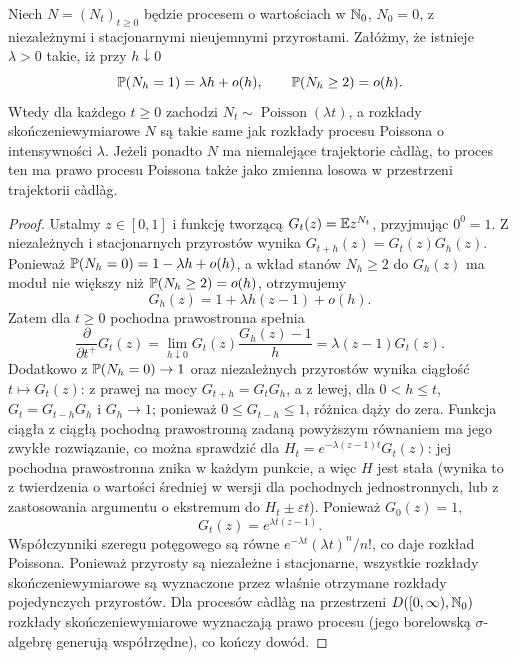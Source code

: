 \begin{twierdzenie}
\label{thm:poisson-infinitesimal}
Niech $N=(N_t)_{t\ge0}$ będzie procesem o wartościach
w $\mathbb{N}_0$, $N_0=0$, z niezależnymi i stacjonarnymi
nieujemnymi przyrostami. Załóżmy, że istnieje $\lambda>0$
takie, iż przy $h\downarrow0$
\[
\mathbb{P}(N_h=1)=\lambda h+o(h),\qquad
\mathbb{P}(N_h\ge2)=o(h).
\]
Wtedy dla każdego $t\ge0$ zachodzi
$N_t\sim\operatorname{Poisson}(\lambda t)$,
a rozkłady skończeniewymiarowe $N$ są takie same jak
rozkłady procesu Poissona o intensywności $\lambda$.
Jeżeli ponadto $N$ ma niemalejące trajektorie c\`adl\`ag,
to proces ten ma prawo procesu Poissona także jako
zmienna losowa w przestrzeni trajektorii c\`adl\`ag.
\end{twierdzenie}
\begin{proof}
Ustalmy $z\in[0,1]$ i funkcję tworzącą
$G_t(z)=\mathbb{E} z^{N_t}$, przyjmując $0^0=1$.
Z niezależnych i stacjonarnych przyrostów wynika
$G_{t+h}(z)=G_t(z)G_h(z)$. Ponieważ
$\mathbb{P}(N_h=0)=1-\lambda h+o(h)$, a wkład stanów
$N_h\ge2$ do $G_h(z)$ ma moduł nie większy niż
$\mathbb{P}(N_h\ge2)=o(h)$, otrzymujemy
\[
G_h(z)=1+\lambda h(z-1)+o(h).
\]
Zatem dla $t\ge0$ pochodna prawostronna spełnia
\[
\frac{\partial}{\partial t^+}G_t(z)
=\lim_{h\downarrow0}G_t(z)\frac{G_h(z)-1}{h}
=\lambda(z-1)G_t(z).
\]
Dodatkowo z $\mathbb{P}(N_h=0)\to1$ oraz niezależnych przyrostów
wynika ciągłość $t\mapsto G_t(z)$: z prawej na mocy
$G_{t+h}=G_tG_h$, a z lewej, dla $0<h\le t$,
$G_t=G_{t-h}G_h$ i $G_h\to1$; ponieważ
$0\le G_{t-h}\le1$, różnica dąży do zera.
Funkcja ciągła z ciągłą pochodną prawostronną zadaną
powyższym równaniem ma jego zwykłe rozwiązanie,
co można sprawdzić dla
$H_t=e^{-\lambda(z-1)t}G_t(z)$:
jej pochodna prawostronna znika w każdym punkcie,
a więc $H$ jest stała (wynika to z twierdzenia
o wartości średniej w wersji dla pochodnych jednostronnych,
lub z zastosowania argumentu o ekstremum do
$H_t\pm\varepsilon t$). Ponieważ $G_0(z)=1$,
\[
G_t(z)=e^{\lambda t(z-1)}.
\]
Współczynniki szeregu potęgowego są równe
$e^{-\lambda t}(\lambda t)^n/n!$, co daje rozkład Poissona.
Ponieważ przyrosty są niezależne i stacjonarne,
wszystkie rozkłady skończeniewymiarowe są wyznaczone
przez właśnie otrzymane rozkłady pojedynczych przyrostów.
Dla procesów c\`adl\`ag na przestrzeni $D([0,\infty),\mathbb{N}_0)$
rozkłady skończeniewymiarowe wyznaczają prawo procesu
(jego borelowską $\sigma$-algebrę generują współrzędne),
co kończy dowód.
\end{proof}

